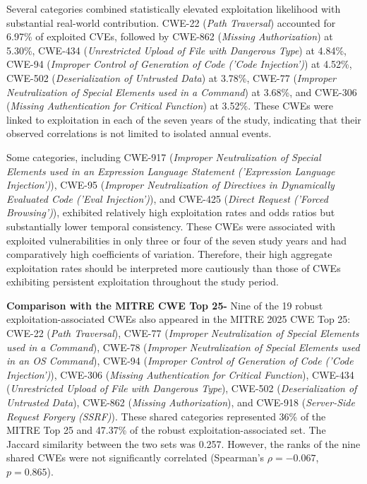 \documentclass[conference,compsoc]{IEEEtran}
\begin{document}
Several categories combined statistically elevated exploitation likelihood with substantial real-world contribution. CWE-22 (\emph{Path Traversal}) accounted for 6.97\% of exploited CVEs, followed by CWE-862 (\emph{Missing Authorization}) at 5.30\%, CWE-434 (\emph{Unrestricted Upload of File with Dangerous Type}) at 4.84\%, CWE-94 (\emph{Improper Control of Generation of Code ('Code Injection')}) at 4.52\%, CWE-502 (\emph{Deserialization of Untrusted Data}) at 3.78\%, CWE-77 (\emph{Improper Neutralization of Special Elements used in a Command}) at 3.68\%, and CWE-306 (\emph{Missing Authentication for Critical Function}) at 3.52\%. These CWEs were linked to exploitation in each of the seven years of the study, indicating that their observed correlations is not limited to isolated annual events.

Some categories, including CWE-917 (\emph{Improper Neutralization of Special Elements used in an Expression Language Statement ('Expression Language Injection')}), CWE-95 (\emph{Improper Neutralization of Directives in Dynamically Evaluated Code ('Eval Injection')}), and CWE-425 (\emph{Direct Request ('Forced Browsing')}), exhibited relatively high exploitation rates and odds ratios but substantially lower temporal consistency. These CWEs were associated with exploited vulnerabilities in only three or four of the seven study years and had comparatively high coefficients of variation. Therefore, their high aggregate exploitation rates should be interpreted more cautiously than those of CWEs exhibiting persistent exploitation throughout the study period.

\textbf{Comparison with the MITRE CWE Top 25-} Nine of the 19 robust exploitation-associated CWEs also appeared in the MITRE 2025 CWE Top 25: CWE-22 (\emph{Path Traversal}), CWE-77 (\emph{Improper Neutralization of Special Elements used in a Command}), CWE-78 (\emph{Improper Neutralization of Special Elements used in an OS Command}), CWE-94 (\emph{Improper Control of Generation of Code ('Code Injection')}), CWE-306 (\emph{Missing Authentication for Critical Function}), CWE-434 (\emph{Unrestricted Upload of File with Dangerous Type}), CWE-502 (\emph{Deserialization of Untrusted Data}), CWE-862 (\emph{Missing Authorization}), and CWE-918 (\emph{Server-Side Request Forgery (SSRF)}). These shared categories represented 36\% of the MITRE Top 25 and 47.37\% of the robust exploitation-associated set. The Jaccard similarity between the two sets was 0.257. However, the ranks of the nine shared CWEs were not significantly correlated (Spearman's $\rho=-0.067$, $p=0.865$).
\end{document}
